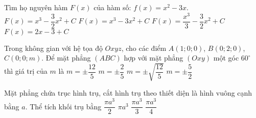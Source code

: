 \begin{ex}%
Tìm họ nguyên hàm $F(x)$ của hàm số: $f(x)=x^2-3x$.
\choice
{$F(x)=x^3-\dfrac{3}{2}x^2+C$}  
{$F(x)=x^3-3x^2+C$}  
{\True $F(x)=\dfrac{x^3}{3}-\dfrac{3}{2}x^2+C$}  
{$F(x)=2x-3+C$}
\end{ex}

\begin{ex}%
Trong không gian với hệ tọa độ $Oxyz$, cho các điểm $A(1;0;0)$, $B(0;2;0)$, $C(0;0;m)$. Để mặt phẳng $(ABC)$ hợp với mặt phẳng $(Oxy)$ một góc $60^\circ$ thì giá trị của $m$ là
\choice
{$m=\pm \dfrac{12}{5}$}  
{$m=\pm \dfrac{2}{5}$	}  
{\True $m=\pm \sqrt{\dfrac{12}{5}}$}  
{$m=\pm \dfrac{5}{2}$}
\end{ex}

\begin{ex}%
Mặt phẳng chứa trục hình trụ, cắt hình trụ theo thiết diện là hình vuông cạnh bằng $a$. Thể tích khối trụ bằng
\choice
{$\dfrac{\pi a^3}{2}$}  
{$\pi a^3$}  
{$\dfrac{\pi a^3}{3}$}  
{\True $\dfrac{\pi a^3}{4}$}
\end{ex}


